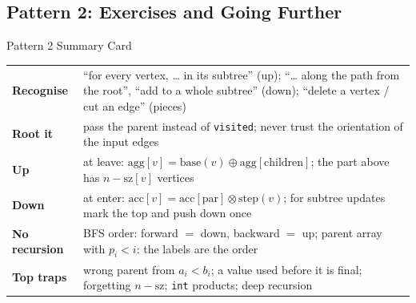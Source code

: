 \subsection{Pattern 2: Exercises and Going Further}
\label{ssec:ch2-p2-ex}

\begin{patternbox}{Pattern 2 Summary Card}
\renewcommand{\arraystretch}{1.25}
\begin{tabularx}{\linewidth}{@{}>{\bfseries}l X@{}}
Recognise & ``for every vertex, \dots{} in its subtree'' (up); ``\dots{} along the path from the root'', ``add to a whole subtree'' (down); ``delete a vertex / cut an edge'' (pieces) \\
Root it & pass the parent instead of \texttt{visited}; never trust the orientation of the input edges \\
Up & at leave: $\mathrm{agg}[v] = \mathrm{base}(v) \oplus \mathrm{agg}[\text{children}]$; the part above has $n - \mathrm{sz}[v]$ vertices \\
Down & at enter: $\mathrm{acc}[v] = \mathrm{acc}[\mathrm{par}] \otimes \mathrm{step}(v)$; for subtree updates mark the top and push down once \\
No recursion & BFS order: forward $=$ down, backward $=$ up; parent array with $p_i < i$: the labels are the order \\
Top traps & wrong parent from $a_i < b_i$; a value used before it is final; forgetting $n - \mathrm{sz}$; \texttt{int} products; deep recursion \\
\end{tabularx}
\end{patternbox}

